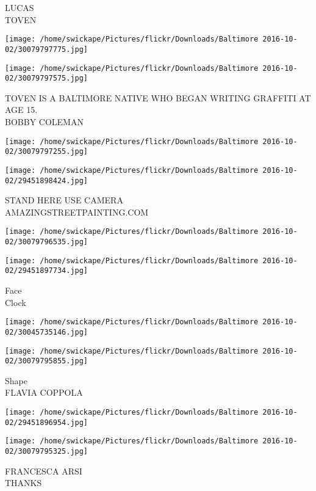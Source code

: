 \documentclass[10pt,letterpaper]{article}
\begin{document}
LUCAS\\
TOVEN
\pagebreak

\texttt{[image: /home/swickape/Pictures/flickr/Downloads/Baltimore 2016-10-02/30079797775.jpg]}

\vspace{0.25in}
\texttt{[image: /home/swickape/Pictures/flickr/Downloads/Baltimore 2016-10-02/30079797575.jpg]}

TOVEN IS A BALTIMORE NATIVE WHO BEGAN WRITING GRAFFITI AT AGE 15.\\
BOBBY COLEMAN
\pagebreak

\texttt{[image: /home/swickape/Pictures/flickr/Downloads/Baltimore 2016-10-02/30079797255.jpg]}

\vspace{0.25in}
\texttt{[image: /home/swickape/Pictures/flickr/Downloads/Baltimore 2016-10-02/29451898424.jpg]}

STAND HERE USE CAMERA\\
AMAZINGSTREETPAINTING.COM
\pagebreak

\texttt{[image: /home/swickape/Pictures/flickr/Downloads/Baltimore 2016-10-02/30079796535.jpg]}

\vspace{0.25in}
\texttt{[image: /home/swickape/Pictures/flickr/Downloads/Baltimore 2016-10-02/29451897734.jpg]}

Face\\
Clock
\pagebreak

\texttt{[image: /home/swickape/Pictures/flickr/Downloads/Baltimore 2016-10-02/30045735146.jpg]}

\vspace{0.25in}
\texttt{[image: /home/swickape/Pictures/flickr/Downloads/Baltimore 2016-10-02/30079795855.jpg]}

Shape\\
FLAVIA COPPOLA
\pagebreak

\texttt{[image: /home/swickape/Pictures/flickr/Downloads/Baltimore 2016-10-02/29451896954.jpg]}

\vspace{0.25in}
\texttt{[image: /home/swickape/Pictures/flickr/Downloads/Baltimore 2016-10-02/30079795325.jpg]}

FRANCESCA ARSI\\
THANKS
\pagebreak
\end{document}
